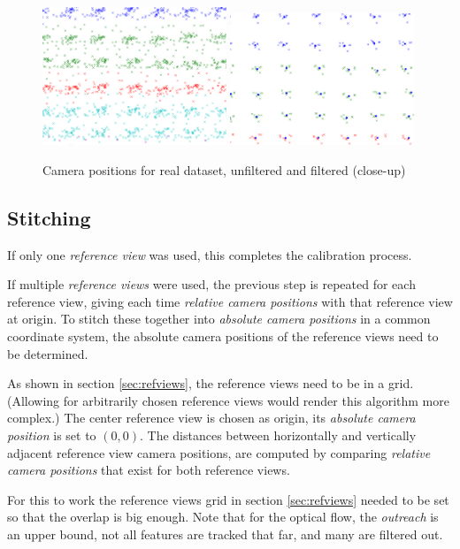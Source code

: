 \documentclass[11pt]{scrreprt}
\begin{document}
\begin{figure}[p]
\includegraphics[width=0.49\textwidth]{rcpos_real_close.pdf}
\includegraphics[width=0.49\textwidth]{rcpos_real_close_f.pdf}
\caption{Camera positions for real dataset, unfiltered and filtered (close-up)}
\label{fig:rcpos_real_close}

\end{figure}



\subsection{Stitching}
If only one \emph{reference view} was used, this completes the calibration process.

If multiple \emph{reference views} were used, the previous step is repeated for each reference view, giving each time \emph{relative camera positions} with that reference view at origin. To stitch these together into \emph{absolute camera positions} in a common coordinate system, the absolute camera positions of the reference views need to be determined.

As shown in section \ref{sec:refviews}, the reference views need to be in a grid. (Allowing for arbitrarily chosen reference views would render this algorithm more complex.) The center reference view is chosen as origin, its \emph{absolute camera position} is set to $(0,0)$. The distances between horizontally and vertically adjacent reference view camera positions, are computed by comparing \emph{relative camera positions} that exist for both reference views.

For this to work the reference views grid in section \ref{sec:refviews} needed to be set so that the overlap is big enough. Note that for the optical flow, the \emph{outreach} is an upper bound, not all features are tracked that far, and many are filtered out.
\end{document}
